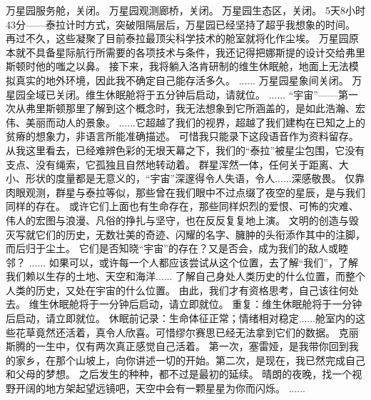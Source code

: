 \documentclass[openany]{book}
\begin{document}
\begin{dialogue}
     万星园服务舱，关闭。
     万星园观测廊桥，关闭。
     万星园生态区，关闭。
     5天8小时43分——泰拉计时方式，突破阻隔层后，万星园已经坚持了超乎我想象的时间。
     再过不久，这些凝聚了目前泰拉最顶尖科学技术的舱室就将化作尘埃。
     万星园原本就不具备星际航行所需要的各项技术与条件，我还记得把娜斯提的设计交给弗里斯顿时他的嗤之以鼻。
     接下来，我将躺入洛肯研制的维生休眠舱，地面上无法模拟真实的地外环境，因此我不确定自己能存活多久。
     ......
     万星园星象间关闭。
     万星园全域已关闭。维生休眠舱将于五分钟后启动，请就位。
     ......
     “宇宙”——第一次从弗里斯顿那里了解到这个概念时，我无法想象到它所涵盖的，是如此浩瀚、宏伟、美丽而动人的景象。
     ......它超越了我们的视界，超越了我们建构在已知之上的贫瘠的想象力，非语言所能准确描述。
     可惜我只能录下这段语音作为资料留存。
     从我这里看去，已经难辨色彩的无垠天幕之下，我们的“泰拉”被星尘包围，它没有支点、没有绳索，它孤独且自然地转动着。
     群星浑然一体，任何关于距离、大小、形状的度量都是无意义的，“宇宙”深邃得令人失语，令人......深感敬畏。
     仅靠肉眼观测，群星与泰拉等似，那些曾在我们眼中不过点缀了夜空的星辰，是与我们同样的存在。
     或许它们上面也有生命存在，那些同样炽烈的爱恨、可怖的灾难、伟人的宏图与浪漫、凡俗的挣扎与坚守，也在反反复复地上演。
     文明的创造与毁灭写就它们的历史，无数壮美的奇迹、闪耀的名字、臃肿的头衔添作其中的注脚，而后归于尘土。
     它们是否知晓“宇宙”的存在？又是否会，成为我们的敌人或睦邻？
     ......
     如果可以，或许每一个人都应该尝试从这个位置，去了解“我们”，了解我们赖以生存的土地、天空和海洋......
     了解自己身处人类历史的什么位置，而整个人类的历史，又处在宇宙的什么位置。
     由此，我们才有资格思考，自己该往何处去。
     维生休眠舱将于一分钟后启动，请立即就位。
     重复：维生休眠舱将于一分钟后启动，请立即就位。
     休眠前记录：生命体征正常；情绪相对稳定......舱室内的这些花草竟然还活着，真令人欣喜。可惜缪尔赛思已经无法拿到它们的数据。
     克丽斯腾的一生中，仅有两次真正感觉自己活着。
     第一次，塞雷娅，是我带你回到我的家乡，在那个山坡上，向你讲述一切的开始。第二次，是现在，我已然完成自己和父母的梦想。
     之后发生的种种，都不过是最初的延续。
     晴朗的夜晚，找一个视野开阔的地方架起望远镜吧，天空中会有一颗星星为你而闪烁。
     ......
\end{dialogue}\par
\end{document}
